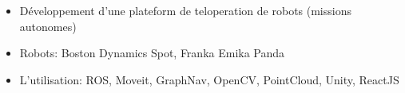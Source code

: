 


    {\begin{itemize}
        \item Développement d'une plateform de teloperation de robots (missions autonomes)
\vspace{-5pt}        \item Robots: Boston Dynamics Spot, Franka Emika Panda
\vspace{-5pt}        \item L'utilisation: ROS, Moveit, GraphNav, OpenCV, PointCloud, Unity, ReactJS
    \end{itemize} \vspace{-5pt}}
    {}{}{}
    